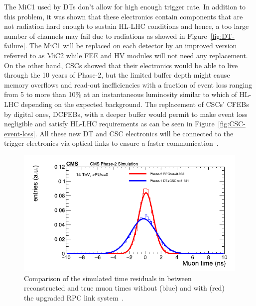 	The \acf{MiC1} used by DTs don't allow for high enough trigger rate. In addition to this problem, it was shown that these electronics contain components that are not radiation hard enough to sustain HL-LHC conditions and hence, a too large number of channels may fail due to radiations as showed in Figure~\ref{fig:DT-failure}. The MiC1 will be replaced on each detector by an improved version referred to as MiC2 while \acf{FEE} and \acf{HV} modules will not need any replacement. On the other hand, CSCs showed that their electronics would be able to live through the 10 years of Phase-2, but the limited buffer depth might cause memory overflows and read-out inefficiencies with a fraction of event loss ranging from 5 to more than 10\% at an instantaneous luminosity similar to which of HL-LHC depending on the expected background. The replacement of CSCs' CFEBs by digital ones, DCFEBs, with a deeper buffer would permit to make event loss negligible and satisfy HL-LHC requirements as can be seen in Figure~\ref{fig:CSC-event-loss}. All these new DT and CSC electronics will be connected to the trigger electronics via optical links to ensure a faster communication~\cite{PHASEIITP}.
	
\endgroup

\begingroup\setlength{\intextsep}{0pt}\setlength{\columnsep}{15pt}

	\begin{figure}
		\centering
		\includegraphics[width=\linewidth]{fig/chapt3/RPC-ugrade-LS.pdf}
		\caption{\label{fig:RPC-time} Comparison of the simulated time residuals in between reconstructed and true muon times without (blue) and with (red) the upgraded RPC link system~\cite{PHASEIITP}.}
	\end{figure}
	
